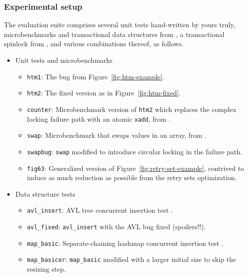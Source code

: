 \subsubsection{Experimental setup}

The evaluation suite comprises several unit tests hand-written by yours truly,
microbenchmarks and transactional data structures from \cite{tm-benchmark-cmu},
a transactional spinlock from \cite{spinlock-rtm-github},
and various combinations thereof,
as follows.


\begin{itemize}
	\item Unit tests and microbenchmarks
	\begin{itemize}
		\item {\tt htm1}: The bug from Figure~\ref{fig:htm-example}. %
		\item {\tt htm2}: The fixed version as in Figure~\ref{fig:htm-fixed}.
		\item {\tt counter}: Microbenchmark version of {\tt htm2} which replaces the complex locking failure path with an atomic {\tt xadd}, from \cite{tm-benchmark-cmu}.
		\item {\tt swap}: Microbenchmark that swaps values in an array, from \cite{tm-benchmark-cmu}.
		\item {\tt swapbug}: {\tt swap} modified to introduce circular locking in the failure path. %
		\item {\tt fig63}: Generalized version of Figure~\ref{fig:retry-set-example},
			contrived to induce as much reduction as possible from the retry sets optimization.
	\end{itemize}
	\item Data structure tests
	\begin{itemize}
		\item {\tt avl\_insert}: AVL tree concurrent insertion test \cite{tm-benchmark-cmu}.
		\item {\tt avl\_fixed}: {\tt avl\_insert} with the AVL bug fixed (spoilers!!).
		\item {\tt map\_basic}: Separate-chaining hashmap concurrent insertion test \cite{tm-benchmark-cmu}.
		\item {\tt map\_basicer}: {\tt map\_basic} modified with a larger initial size to skip the resizing step.

\end{itemize}
\end{itemize}
